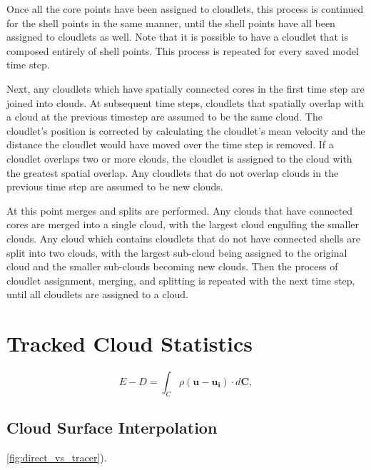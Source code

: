 \documentclass[12pt]{article}
\begin{document}
Once all the core points have been assigned to cloudlets, this process is 
continued for the shell points in the same manner, until the shell points have 
all been assigned to cloudlets as well.  Note that it is possible to have a 
cloudlet that is composed entirely of shell points.  This process is repeated 
for every saved model time step.

Next, any cloudlets which have spatially connected cores in the first time step 
are joined into clouds.  At subsequent time steps, cloudlets that spatially 
overlap with a cloud at the previous timestep are assumed to be the same cloud.
The cloudlet's position is corrected by calculating the cloudlet's mean 
velocity and the distance the cloudlet would have moved over the time step is 
removed.  If a cloudlet overlaps two or more clouds, the cloudlet is assigned 
to the cloud with the greatest spatial overlap.  Any cloudlets that do not 
overlap clouds in the previous time step are assumed to be new clouds.

At this point merges and splits are performed.  Any clouds that have connected 
cores are merged into a single cloud, with the largest cloud engulfing the 
smaller clouds.  Any cloud which contains cloudlets that do not have connected
shells are split into two clouds, with the largest sub-cloud being assigned to 
the original cloud and the smaller sub-clouds becoming new clouds.  Then the 
process of cloudlet assignment, merging, and splitting is repeated with the 
next time step, until all cloudlets are assigned to a cloud.


\section{Tracked Cloud Statistics}







\begin{equation}
\label{eq:E_minus_D} 
E - D = \int_C \rho ( \mathbf{u} -  \mathbf{u_i}) \cdot d\mathbf{C},
\end{equation}

\subsection{Cloud Surface Interpolation}

\ref{fig:direct_vs_tracer}).
\end{document}
